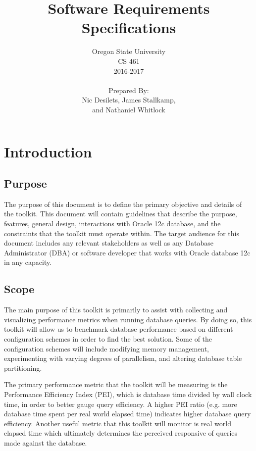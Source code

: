 \documentclass[draftclsnofoot, onecolumn, 10pt]{IEEEtran}
\title{\huge Software Requirements Specifications}
\author{Oregon State University\\CS 461\\2016-2017\\\\Prepared By:\\Nic Desilets, James Stallkamp,\\and Nathaniel Whitlock}
\begin{document}
\begin{titlingpage}
    \maketitle 
\end{titlingpage}


\section{Introduction}
\subsection{Purpose}
The purpose of this document is to define the primary objective and details of the toolkit. This document will contain guidelines that describe the purpose, features, general design, interactions with Oracle 12c database, and the constraints that the toolkit must operate within. The target audience for this document includes any relevant stakeholders as well as any Database Administrator (DBA) or software developer that works with Oracle database 12c in any capacity.

\subsection{Scope}
The main purpose of this toolkit is primarily to assist with collecting and visualizing performance metrics when running database queries. By doing so, this toolkit will allow us to benchmark database performance based on different configuration schemes in order to find the best solution. Some of the configuration schemes will include modifying memory management, experimenting with varying degrees of parallelism, and altering database table partitioning. 

The primary performance metric that the toolkit will be measuring is the Performance Efficiency Index (PEI), which is database time divided by wall clock time, in order to better gauge query efficiency. A higher PEI ratio (e.g. more database time spent per real world elapsed time) indicates higher database query efficiency. Another useful metric that this toolkit will monitor is real world elapsed time which ultimately determines the perceived responsive of queries made against the database.
\end{document}
